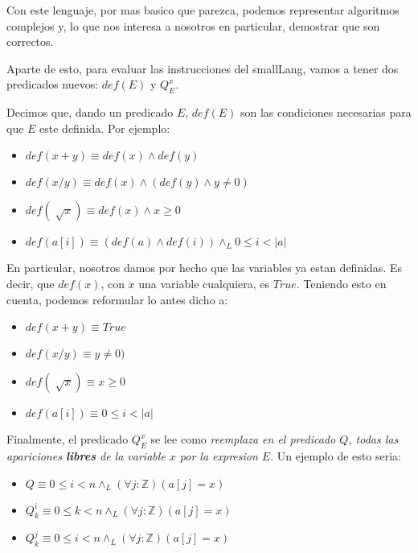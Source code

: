 \documentclass{article}
\begin{document}
Con este lenguaje, por mas basico que parezca, podemos representar algoritmos complejos y, lo que nos interesa a nosotros en particular, demostrar que son correctos.

Aparte de esto, para evaluar las instrucciones del smallLang, vamos a tener dos predicados nuevos: $def(E)$ y $Q_{E}^{x}$.

Decimos que, dando un predicado $E$, $def(E)$ son las condiciones necesarias para que $E$ este definida. Por ejemplo:

\begin{itemize}
	\item[] $def(x + y) \equiv def(x) \land def(y)$
	
	\item[] $def(x / y) \equiv def(x) \land (def(y) \land y \neq 0)$
	
	\item[] $def( \sqrt[]{x} ) \equiv def(x) \land x \geq 0$
	
	\item[] $def( a[i] ) \equiv (def(a) \land def(i)) \land_{L} 0 \leq i < |a|$
\end{itemize}

En particular, nosotros damos por hecho que las variables ya estan definidas. Es decir, que $def(x)$, con $x$ una variable cualquiera, es $True$. Teniendo esto en cuenta, podemos reformular lo antes dicho a:

\begin{itemize}
	\item[] $def(x + y) \equiv True$
	
	\item[] $def(x / y) \equiv y \neq 0)$
	
	\item[] $def( \sqrt[]{x} ) \equiv x \geq 0$
	
	\item[] $def( a[i] ) \equiv 0 \leq i < |a|$
\end{itemize}

Finalmente, el predicado $Q_{E}^x$ se lee como \textit{reemplaza en el predicado $Q$, todas las apariciones \textbf{libres} de la variable $x$ por la expresion $E$}. Un ejemplo de esto seria:

\begin{itemize}
	\item[] $Q \equiv 0 \leq i < n \land_{L} (\forall j : \mathbb{Z}) (a[j] = x)$
	
	\item[] $Q_{k}^{i} \equiv 0 \leq k < n \land_{L} (\forall j : \mathbb{Z}) (a[j] = x)$
	
	\item[] $Q_{k}^{j} \equiv 0 \leq i < n \land_{L} (\forall j : \mathbb{Z}) (a[j] = x)$
\end{itemize}
\end{document}
